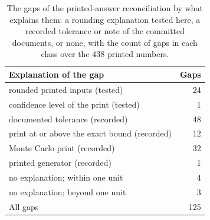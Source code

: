 \begin{table}[htbp]
\centering
\small
\caption{The gaps of the printed-answer reconciliation by what explains them: a rounding explanation tested here, a recorded tolerance or note of the committed documents, or none, with the count of gaps in each class over the 438 printed numbers.}
\label{tab:miss-categories}
\begin{tabular}{p{9cm}r}
\toprule
Explanation of the gap & Gaps \\
\midrule
rounded printed inputs (tested) & 24 \\
confidence level of the print (tested) & 1 \\
documented tolerance (recorded) & 48 \\
print at or above the exact bound (recorded) & 12 \\
Monte Carlo print (recorded) & 32 \\
printed generator (recorded) & 1 \\
no explanation; within one unit & 4 \\
no explanation; beyond one unit & 3 \\
All gaps & 125 \\
\bottomrule
\end{tabular}
\end{table}
